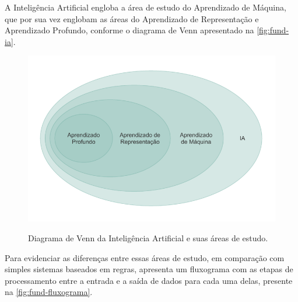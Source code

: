 A Inteligência Artificial engloba a área de estudo do Aprendizado de Máquina, que por sua vez englobam as áreas do Aprendizado de Representação e Aprendizado Profundo, conforme o diagrama de Venn apresentado na \autoref{fig:fund-ia}.

\begin{figure}[h!] %
  \centering
  \caption{Diagrama de Venn da Inteligência Artificial e suas áreas de estudo. }
  \includegraphics[scale=1.1]{img/img-fundamentacao-ia.pdf}
  \label{fig:fund-ia}
\end{figure}

Para evidenciar as diferenças entre essas áreas de estudo, em comparação com simples sistemas baseados em regras,  apresenta um fluxograma com as etapas de processamento entre a entrada e a saída de dados para cada uma delas, presente na \autoref{fig:fund-fluxograma}.

